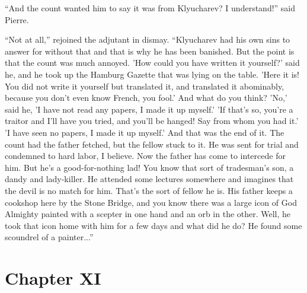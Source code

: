 ``And the count wanted him to say it was from Klyucharev? I
understand!''  said Pierre.

``Not at all,'' rejoined the adjutant in dismay. ``Klyucharev had
his own sins to answer for without that and that is why he has
been banished.  But the point is that the count was much
annoyed. 'How could you have written it yourself?' said he, and
he took up the Hamburg Gazette that was lying on the table. 'Here
it is! You did not write it yourself but translated it, and
translated it abominably, because you don't even know French, you
fool.' And what do you think? 'No,' said he, 'I have not read any
papers, I made it up myself.' 'If that's so, you're a traitor and
I'll have you tried, and you'll be hanged! Say from whom you had
it.' 'I have seen no papers, I made it up myself.' And that was
the end of it. The count had the father fetched, but the fellow
stuck to it. He was sent for trial and condemned to hard labor, I
believe. Now the father has come to intercede for him. But he's a
good-for-nothing lad!  You know that sort of tradesman's son, a
dandy and lady-killer. He attended some lectures somewhere and
imagines that the devil is no match for him. That's the sort of
fellow he is. His father keeps a cookshop here by the Stone
Bridge, and you know there was a large icon of God Almighty
painted with a scepter in one hand and an orb in the other.
Well, he took that icon home with him for a few days and what did
he do?  He found some scoundrel of a painter...''


\chapter*{Chapter XI} \ifaudio {}
\fi

